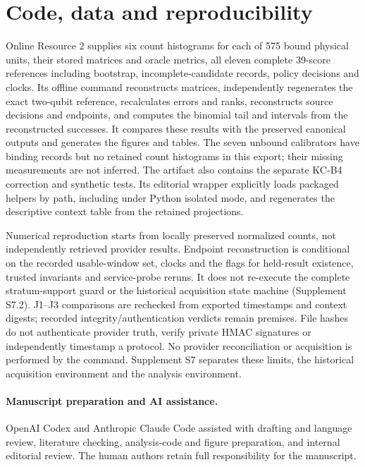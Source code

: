 \documentclass[pdflatex,sn-mathphys-num]{sn-jnl}
\begin{document}
\section{Code, data and reproducibility}
Online Resource 2 supplies six count histograms for each of 575 bound physical units, their stored matrices and oracle metrics, all eleven complete 39-score references including bootstrap, incomplete-candidate records, policy decisions and clocks. Its offline command reconstructs matrices, independently regenerates the exact two-qubit reference, recalculates errors and ranks, reconstructs source decisions and endpoints, and computes the binomial tail and intervals from the reconstructed successes. It compares these results with the preserved canonical outputs and generates the figures and tables. The seven unbound calibrators have binding records but no retained count histograms in this export; their missing measurements are not inferred. The artifact also contains the separate KC-B4 correction and synthetic tests. Its editorial wrapper explicitly loads packaged helpers by path, including under Python isolated mode, and regenerates the descriptive context table from the retained projections.

Numerical reproduction starts from locally preserved normalized counts, not independently retrieved provider results. Endpoint reconstruction is conditional on the recorded usable-window set, clocks and the flags for held-result existence, trusted invariants and service-probe reruns. It does not re-execute the complete stratum-support guard or the historical acquisition state machine (Supplement S7.2). J1--J3 comparisons are rechecked from exported timestamps and context digests; recorded integrity/authentication verdicts remain premises. File hashes do not authenticate provider truth, verify private HMAC signatures or independently timestamp a protocol. No provider reconciliation or acquisition is performed by the command. Supplement S7 separates these limits, the historical acquisition environment and the analysis environment.

\paragraph{Manuscript preparation and AI assistance.} OpenAI Codex and Anthropic Claude Code assisted with drafting and language review, literature checking, analysis-code and figure preparation, and internal editorial review. The human authors retain full responsibility for the manuscript.
\end{document}
